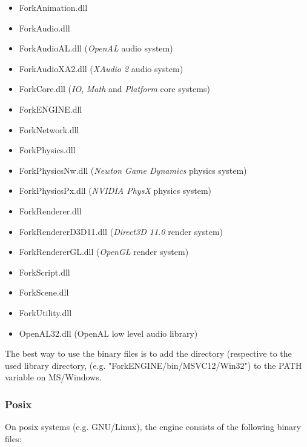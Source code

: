 \documentclass{article}
\begin{document}
\begin{itemize}

\item
ForkAnimation.dll

\item
ForkAudio.dll

\item
ForkAudioAL.dll (\textit{OpenAL} audio system)

\item
ForkAudioXA2.dll (\textit{XAudio 2} audio system)

\item
ForkCore.dll (\textit{IO}, \textit{Math} and \textit{Platform} core systems)

\item
ForkENGINE.dll

\item
ForkNetwork.dll

\item
ForkPhysics.dll

\item
ForkPhysicsNw.dll (\textit{Newton Game Dynamics} physics system)

\item
ForkPhysicsPx.dll (\textit{NVIDIA PhysX} physics system)

\item
ForkRenderer.dll

\item
ForkRendererD3D11.dll (\textit{Direct3D 11.0} render system)

\item
ForkRendererGL.dll (\textit{OpenGL} render system)

\item
ForkScript.dll

\item
ForkScene.dll

\item
ForkUtility.dll

\item
OpenAL32.dll (OpenAL low level audio library)

\end{itemize}

The best way to use the binary files is to add the directory (respective to the used library directory,
(e.g. "ForkENGINE/bin/MSVC12/Win32") to the PATH variable on MS/Windows.

\subsubsection{Posix}
On posix systems (e.g. GNU/Linux), the engine consists of the following binary files:
\end{document}

